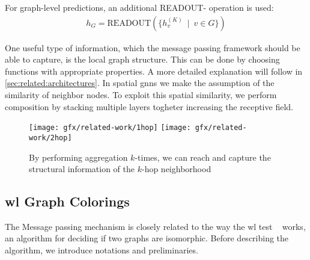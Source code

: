 For graph-level predictions, an additional READOUT- operation is used:
\begin{align*}
    h_{G} =\mathrm{READOUT}(\{h_{v}^{(K)}\ \mid \ v \in G\})
\end{align*}

One useful type of information, which the message passing framework should be able to
capture, is the local graph structure. This can be done by choosing functions with
appropriate properties. A more detailed explanation will follow in
\cref{sec:related:architectures}. In spatial \acp{gnn} we make the assumption of the
similarity of neighbor nodes. To exploit this spatial similarity, we perform
composition by stacking multiple layers togheter increasing the receptive field.

\begin{figure}[ht]
    \centering
    \texttt{[image: gfx/related-work/1hop]}\hspace{1cm}
    \texttt{[image: gfx/related-work/2hop]}
    \caption{By performing aggregation $k$-times, we can reach and capture the
        structural information of the $k$-hop neighborhood}\label{fig:related:1hop}
\end{figure}


\subsection{\acl*{wl} Graph Colorings}
\label{sec:related:character:wl}
The Message passing mechanism is closely related to the way the \acf{wl} test ~\cite{Weisfeiler1968,Damke2020,Huang2022} works, an algorithm for deciding if two graphs are isomorphic.
Before describing the algorithm, we introduce notations and preliminaries.\\

